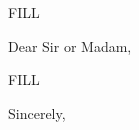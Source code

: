 \documentclass[
	pagenumber=false, %
	parskip=half, %
	fromalign=right, %
	foldmarks=true, %
	addrfield=true %
	]{scrlttr2}
\date{\today}
\begin{document}

\begin{letter}{FILL} %


\opening{Dear Sir or Madam,}

FILL

\closing{Sincerely,}


\end{letter}
\end{document}
